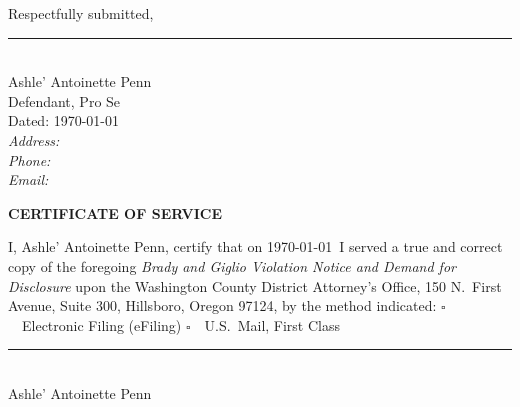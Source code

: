 \documentclass[12pt,letterpaper]{extarticle}
\begin{document}
\vspace{24pt}
\noindent\hspace{0.5in}Respectfully submitted,

\vspace{48pt}
\noindent\hspace{0.5in}\rule{2.5in}{0.4pt}\\[4pt]
\noindent\hspace{0.5in}Ashle' Antoinette Penn\\
\noindent\hspace{0.5in}Defendant, Pro Se\\[6pt]
\noindent\hspace{0.5in}Dated: \today\\[6pt]
\noindent\hspace{0.5in}\textit{Address:} \underline{\hspace{2.2in}}\\[4pt]
\noindent\hspace{0.5in}\textit{Phone:} \underline{\hspace{2.2in}}\\[4pt]
\noindent\hspace{0.5in}\textit{Email:} \underline{\hspace{2.2in}}

\newpage
\begin{center}{\fontsize{11}{13}\bfseries\selectfont CERTIFICATE OF SERVICE}
\end{center}
\vspace{12pt}
I, Ashle' Antoinette Penn, certify that on \today\ I served a true and correct
copy of the foregoing \textit{Brady and Giglio Violation Notice and Demand for
Disclosure} upon the Washington County District Attorney's Office,
150 N.\ First Avenue, Suite 300, Hillsboro, Oregon 97124, by the method indicated:
\vspace{12pt}
\noindent\hspace{0.5in}$\square$\ \ Electronic Filing (eFiling)
\hspace{0.8in}
$\square$\ \ U.S.\ Mail, First Class
\vspace{36pt}
\noindent\hspace{0.5in}\rule{2.5in}{0.4pt}\\[4pt]
\noindent\hspace{0.5in}Ashle' Antoinette Penn
\end{document}
